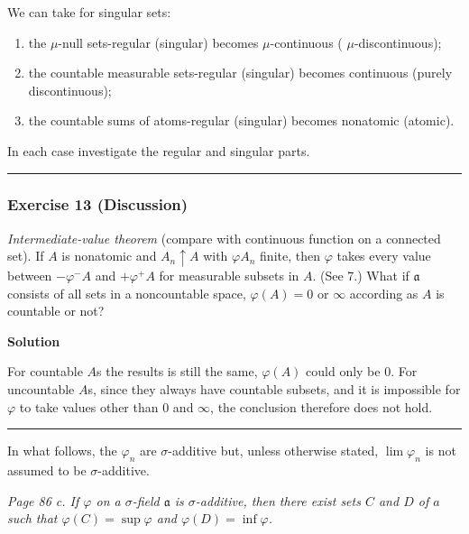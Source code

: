\documentclass[
]{article}
\begin{document}
We can take for singular sets:

\begin{enumerate}
  \def\labelenumi{\arabic{enumi}.}
  \item
        the \(\mu\)-null sets-regular (singular) becomes \(\mu\)-continuous (
        \(\mu\)-discontinuous);
  \item
        the countable measurable sets-regular (singular) becomes continuous
        (purely discontinuous);
  \item
        the countable sums of atoms-regular (singular) becomes nonatomic
        (atomic).
\end{enumerate}

In each case investigate the regular and singular parts.

\begin{center}\rule{0.5\linewidth}{0.5pt}\end{center}

\hypertarget{exercise-13-discussion}{%
  \subsubsection{Exercise 13 (Discussion)}\label{exercise-13-discussion}}

\emph{Intermediate-value theorem} (compare with continuous function on a
connected set). If \(A\) is nonatomic and \(A_n \uparrow A\) with
\(\varphi A_n\) finite, then \(\varphi\) takes every value between
\(-\varphi^-A\) and \(+\varphi^{+} A\) for measurable subsets in \(A\).
(See 7.) What if \(\mathfrak a\) consists of all sets in a noncountable
space, \(\varphi(A)=0\) or \(\infty\) according as \(A\) is countable or
not?

\textbf{Solution}

For countable \(A\)\textquotesingle s the results is still the same,
\(\varphi(A)\) could only be \(0\). For uncountable
\(A\)\textquotesingle s, since they always have countable subsets, and
it is impossible for \(\varphi\) to take values other than \(0\) and
\(\infty\), the conclusion therefore does not hold.

\begin{center}\rule{0.5\linewidth}{0.5pt}\end{center}

In what follows, the \(\varphi_n\) are \(\sigma\)-additive but, unless
otherwise stated, \(\lim \varphi_n\) is not assumed to be
\(\sigma\)-additive.

\emph{Page 86 c. If \(\varphi\) on a \(\sigma\)-field \(\mathfrak a\) is
  \(\sigma\)-additive, then there exist sets \(C\) and \(D\) of \(a\) such
  that \(\varphi(C)=\sup \varphi\) and \(\varphi(D)=\inf \varphi\).}
\end{document}

